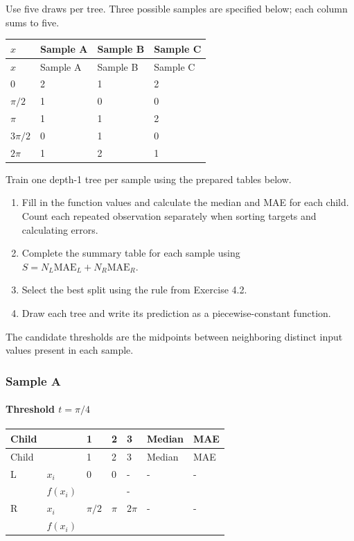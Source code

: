 \documentclass{course_sheet}
\begin{document}
Use five draws per tree. Three possible samples are specified below; each column sums to five.

\begingroup
\small
\setlength{\tabcolsep}{4pt}
\begin{longtable}{l|l|l|l}
$x$ & Sample A & Sample B & Sample C \\
\hline
\endfirsthead
$x$ & Sample A & Sample B & Sample C \\
\hline
\endhead
$0$ & 2 & 1 & 2 \\[1.5pt]
$\pi/2$ & 1 & 0 & 0 \\[1.5pt]
$\pi$ & 1 & 1 & 2 \\[1.5pt]
$3\pi/2$ & 0 & 1 & 0 \\[1.5pt]
$2\pi$ & 1 & 2 & 1 \\[1.5pt]
\end{longtable}
\endgroup
Train one depth-1 tree per sample using the prepared tables below.

\begin{enumerate}
\item
Fill in the function values and calculate the median and MAE for each child. Count each repeated observation separately when sorting targets and calculating errors.

\item
Complete the summary table for each sample using $S=N_L\mathrm{MAE}_L+N_R\mathrm{MAE}_R$.

\item
Select the best split using the rule from Exercise 4.2.

\item
Draw each tree and write its prediction as a piecewise-constant function.

\end{enumerate}
The candidate thresholds are the midpoints between neighboring distinct input values present in each sample.

\subsubsection*{Sample A}
\paragraph*{Threshold $t=\pi/4$}
\begingroup
\small
\setlength{\tabcolsep}{4pt}
\begin{longtable}{l|l|l|l|l|l|l}
Child &  & 1 & 2 & 3 & Median & MAE \\
\hline
\endfirsthead
Child &  & 1 & 2 & 3 & Median & MAE \\
\hline
\endhead
L & $x_i$ & $0$ & $0$ & - & - & - \\[3pt]
 & $f(x_i)$ & $\phantom{0}$ & $\phantom{0}$ & - & $\phantom{0}$ & $\phantom{0}$ \\[3pt]
R & $x_i$ & $\pi/2$ & $\pi$ & $2\pi$ & - & - \\[3pt]
 & $f(x_i)$ & $\phantom{0}$ & $\phantom{0}$ & $\phantom{0}$ & $\phantom{0}$ & $\phantom{0}$ \\[3pt]
\end{longtable}
\endgroup
\end{document}
